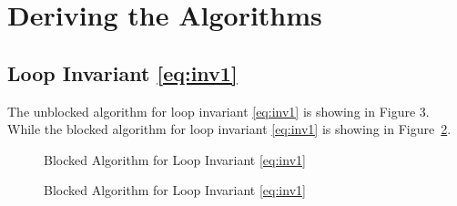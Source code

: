 \documentclass[12pt]{article}
\begin{document}
\section{Deriving the Algorithms}

\subsection{Loop Invariant \eqref{eq:inv1}}

The unblocked algorithm for loop invariant \eqref{eq:inv1} is showing in Figure 3. While the blocked algorithm for loop invariant \eqref{eq:inv1} is showing in Figure~\ref{fig:blk_inv1}.











\begin{figure}
	\begin{center}
		\FlaWorksheet
	\end{center}
	\caption{Blocked Algorithm for Loop Invariant \eqref{eq:inv1}}
	\label{fig:blk_inv1}
\end{figure}



\begin{figure}
	\begin{center}
		\FlaWorksheet
	\end{center}
	\caption{Blocked Algorithm for Loop Invariant \eqref{eq:inv1}}
	\label{fig:blk_inv1}
\end{figure}


\end{document}
